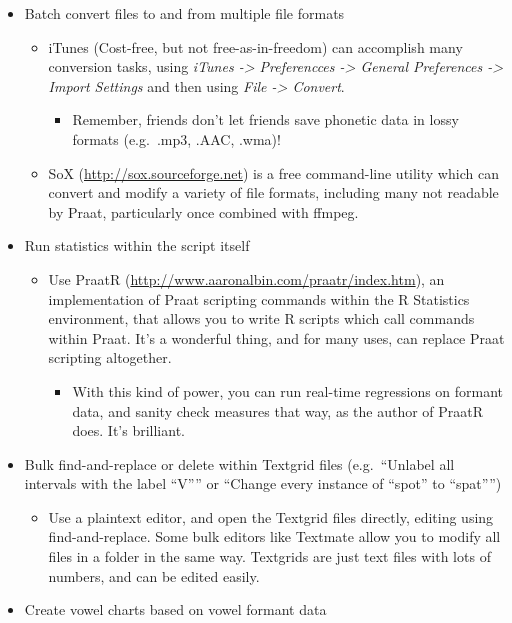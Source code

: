 \documentclass[11pt]{article}
\def\tightlist{}
\begin{document}
\begin{itemize}
\tightlist
\item
  Batch convert files to and from multiple file formats

  \begin{itemize}
  \tightlist
  \item
    iTunes (Cost-free, but not free-as-in-freedom) can accomplish many
    conversion tasks, using \emph{iTunes -\textgreater{} Preferencces
    -\textgreater{} General Preferences -\textgreater{} Import Settings}
    and then using \emph{File -\textgreater{} Convert}.

    \begin{itemize}
    \tightlist
    \item
      Remember, friends don't let friends save phonetic data in lossy
      formats (e.g.~.mp3, .AAC, .wma)!
    \end{itemize}
  \item
    SoX (\url{http://sox.sourceforge.net}) is a free command-line
    utility which can convert and modify a variety of file formats,
    including many not readable by Praat, particularly once combined
    with ffmpeg.
  \end{itemize}
\item
  Run statistics within the script itself

  \begin{itemize}
  \tightlist
  \item
    Use PraatR (\url{http://www.aaronalbin.com/praatr/index.htm}), an
    implementation of Praat scripting commands within the R Statistics
    environment, that allows you to write R scripts which call commands
    within Praat. It's a wonderful thing, and for many uses, can replace
    Praat scripting altogether.

    \begin{itemize}
    \tightlist
    \item
      With this kind of power, you can run real-time regressions on
      formant data, and sanity check measures that way, as the author of
      PraatR does. It's brilliant.
    \end{itemize}
  \end{itemize}
\item
  Bulk find-and-replace or delete within Textgrid files (e.g.~``Unlabel
  all intervals with the label ``V'''' or ``Change every instance of
  ``spot'' to ``spat'''')

  \begin{itemize}
  \tightlist
  \item
    Use a plaintext editor, and open the Textgrid files directly,
    editing using find-and-replace. Some bulk editors like Textmate
    allow you to modify all files in a folder in the same way. Textgrids
    are just text files with lots of numbers, and can be edited easily.
  \end{itemize}
\item
  Create vowel charts based on vowel formant data


\end{itemize}
\end{document}
